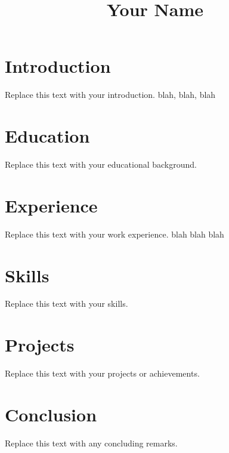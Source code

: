 \documentclass{article}
\begin{document}
\title{Your Name}
\author{}
\date{}

\maketitle

\section{Introduction}
Replace this text with your introduction. blah, blah, blah

\section{Education}
Replace this text with your educational background.

\section{Experience}
Replace this text with your work experience. blah blah blah

\section{Skills}
Replace this text with your skills.

\section{Projects}
Replace this text with your projects or achievements.

\section{Conclusion}
Replace this text with any concluding remarks.
\end{document}
